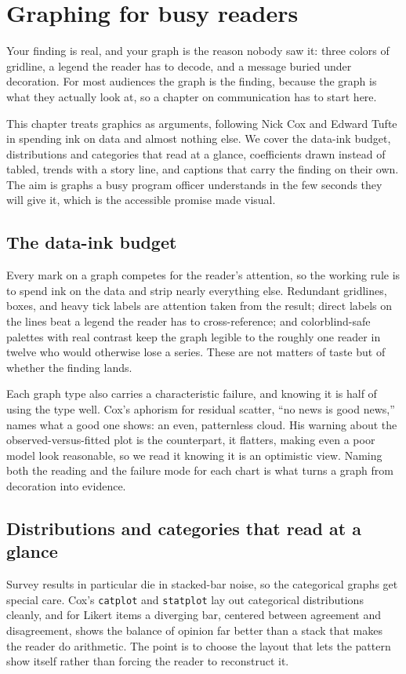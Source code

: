 \documentclass[
    a4paper,
    fontsize=10pt,
    twoside=true,
    numbers=noenddot,
]{kaobook}
\begin{document}

\chapter{Graphing for busy readers}\label{ch:graphs}

Your finding is real, and your graph is the reason nobody saw it: three colors of gridline, a legend the reader has to decode, and a message buried under decoration. For most audiences the graph is the finding, because the graph is what they actually look at, so a chapter on communication has to start here.

This chapter treats graphics as arguments, following Nick Cox and Edward Tufte in spending ink on data and almost nothing else. We cover the data-ink budget, distributions and categories that read at a glance, coefficients drawn instead of tabled, trends with a story line, and captions that carry the finding on their own. The aim is graphs a busy program officer understands in the few seconds they will give it, which is the accessible promise made visual.

\section{The data-ink budget}
Every mark on a graph competes for the reader's attention, so the working rule is to spend ink on the data and strip nearly everything else. Redundant gridlines, boxes, and heavy tick labels are attention taken from the result; direct labels on the lines beat a legend the reader has to cross-reference; and colorblind-safe palettes with real contrast keep the graph legible to the roughly one reader in twelve who would otherwise lose a series. These are not matters of taste but of whether the finding lands.

Each graph type also carries a characteristic failure, and knowing it is half of using the type well. Cox's aphorism for residual scatter, \enquote{no news is good news,} names what a good one shows: an even, patternless cloud. His warning about the observed-versus-fitted plot is the counterpart, it flatters, making even a poor model look reasonable, so we read it knowing it is an optimistic view. Naming both the reading and the failure mode for each chart is what turns a graph from decoration into evidence.

\section{Distributions and categories that read at a glance}
Survey results in particular die in stacked-bar noise, so the categorical graphs get special care. Cox's \texttt{catplot} and \texttt{statplot} lay out categorical distributions cleanly, and for Likert items a diverging bar, centered between agreement and disagreement, shows the balance of opinion far better than a stack that makes the reader do arithmetic. The point is to choose the layout that lets the pattern show itself rather than forcing the reader to reconstruct it.
\end{document}
